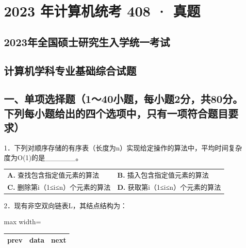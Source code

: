 \documentclass[UTF8,11pt]{ctexart}
\begin{document}
\section*{2023 年计算机统考 408 · 真题}
\subsection*{2023年全国硕士研究生入学统一考试}

\subsection*{计算机学科专业基础综合试题}

\subsection*{一、单项选择题（1～40小题，每小题2分，共80分。下列每小题给出的四个选项中，只有一项符合题目要求）}

1．下列对顺序存储的有序表（长度为n）实现给定操作的算法中，平均时间复杂度为O(1)的是\_\_\_\_\_\_。


\begin{center}\begin{tabular}{>{\raggedright\arraybackslash}p{\dimexpr(\linewidth-4\tabcolsep)/2\relax}>{\raggedright\arraybackslash}p{\dimexpr(\linewidth-4\tabcolsep)/2\relax}}
\textbf{A.} 查找包含指定值元素的算法 & \textbf{B.} 插入包含指定值元素的算法\\[.35em]
\textbf{C.} 删除第i（1≤i≤n）个元素的算法 & \textbf{D.} 获取第i（1≤i≤n）个元素的算法\\[.35em]\end{tabular}\end{center}

2．现有非空双向链表L，其结点结构为：


\begin{center}\begin{adjustbox}{max width=\linewidth}\begin{tabular}{|>{\raggedright\arraybackslash}p{\dimexpr(\linewidth-6\tabcolsep-4\arrayrulewidth)/3\relax}|>{\raggedright\arraybackslash}p{\dimexpr(\linewidth-6\tabcolsep-4\arrayrulewidth)/3\relax}|>{\raggedright\arraybackslash}p{\dimexpr(\linewidth-6\tabcolsep-4\arrayrulewidth)/3\relax}|}\hline
prev & data & next\\\hline\end{tabular}\end{adjustbox}\end{center}
\end{document}
